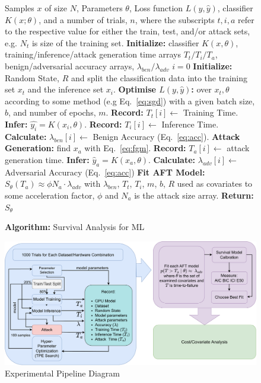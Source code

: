 \documentclass[conference]{IEEEtran}
\begin{document}
\begin{figure}[h!]
    \caption{\textbf{Algorithm: }Survival Analysis for ML}
    \label{fig:alg}
\begin{algorithmic}
    \Require Samples $x$ of size $N$, Parameters $\theta$, Loss function $L(y, \hat{y})$, classifier $K(x; \theta)$, and a number of trials, $n$, where the subscripts $t,i,a$ refer to the respective value for either the train, test, and/or attack sets, e.g. $N_t$ is size of the training set.
    \State \textbf{Initialize:} classifier $K(x, \theta)$, training/inference/attack generation time arrays $T_t/T_i/T_a$, benign/adversarial accuracy arrays, $\lambda_{ben}/ \lambda_{adv}$
    \State $i = 0$
    \State \textbf{Initialize:} Random State, $R$ and split the classification data into the training set $x_t$ and the inference set $x_i$.
    \State \textbf{Optimise $L(y, \hat{y})$:} over $x_t, \theta$ according to some method (e.g Eq.~\ref{eq:sgd}) with a given batch size, $b$, and number of epochs, $m$.
    \State \textbf{Record:} $T_t[i] \gets$ Training Time.
    \State \textbf{Infer:}  $ \hat{y_i} = K(x_i, \theta) $.
    \State \textbf{Record:}  $ T_i[i] \gets $  Inference Time.
    \State \textbf{Calculate:}  $\lambda_{ben}[i] \gets $  Benign Accuracy (Eq.~\ref{eq:acc}).
    \State \textbf{Attack Generation: } find $x_a$ with Eq.~\ref{eq:fgm}.
    \State \textbf{Record:} $T_a[i] \gets$ attack generation time.
    \State \textbf{Infer:}  $ \hat{y}_a = K(x_a, \theta) $.
    \State \textbf{Calculate:}  $\lambda_{adv}[i] \gets $  Adversarial Accuracy (Eq.~\ref{eq:acc})
    \EndWhile
    \State \textbf{Fit AFT Model:} $S_{\theta}(T_a) \approx \phi N_a \cdot \lambda_{adv}$ with $\lambda_{ben}$, $T_t$, $T_i$, $m$, $b$, $R$ used as covariates to some acceleration factor, $\phi$ and  $N_a$ is the attack size array.
    \State \textbf{Return:} $S_{\theta}$
\end{algorithmic}
\end{figure}


\begin{figure}
    \centering
    \includegraphics[width=.35\textwidth]{plots/experiment.pdf}
    \caption{Experimental Pipeline Diagram}
    \label{fig:experiments}
\end{figure}
\end{document}
